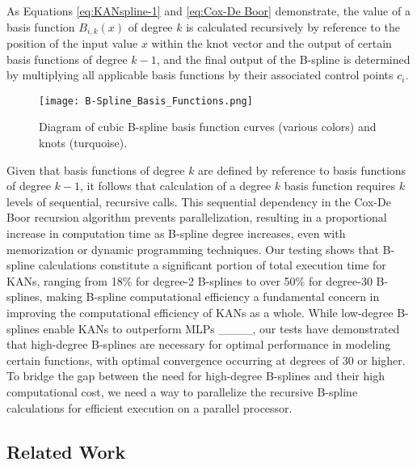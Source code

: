 As Equations \ref{eq:KANspline-1} and \ref{eq:Cox-De Boor} demonstrate, the value of a basis function \(B_{i,k} (x)\) of degree \(k\) is calculated recursively by reference to the position of the input value \(x\) within the knot vector and the output of certain basis functions of degree \(k-1\), and the final output of the B-spline is determined by multiplying all applicable basis functions by their associated control points \(c_i\).
\begin{figure} [ht]
\begin{center}
\centerline{\texttt{[image: B-Spline\_Basis\_Functions.png]}}
\caption{Diagram of cubic B-spline basis function curves (various colors) and knots (turquoise).}
\label{fig:b-spline basis functions}
\end{center}
\end{figure}

Given that basis functions of degree \(k\) are defined by reference to basis functions of degree \(k - 1\), it follows that calculation of a degree \(k\) basis function requires \(k\) levels of sequential, recursive calls. This sequential dependency in the Cox-De Boor recursion algorithm prevents parallelization, resulting in a proportional increase in computation time as B-spline degree increases, even with memorization or dynamic programming techniques. Our testing shows that B-spline calculations constitute a significant portion of total execution time for KANs, ranging from 18\% for degree-2 B-splines to over 50\% for degree-30 B-splines, making B-spline computational efficiency a fundamental concern in improving the computational efficiency of KANs as a whole. While low-degree B-splines enable KANs to outperform MLPs ____, our tests have demonstrated that high-degree B-splines are necessary for optimal performance in modeling certain functions, with optimal convergence occurring at degrees of 30 or higher. 
To bridge the gap between the need for high-degree B-splines and their high computational cost, we need a way to parallelize the recursive B-spline calculations for efficient execution on a parallel processor.

\subsection{Related Work}

